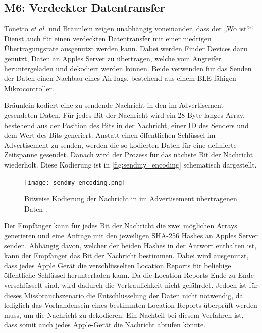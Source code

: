 \subsection{M6: Verdeckter Datentransfer}
\label{missbrauch:6}
Tonetto \textit{et al.} \cite{Tonetto_FindMy} und Bräunlein \cite{braeunlein_sendmy} zeigen unabhängig voneinander, dass der „Wo ist?“ Dienst auch für einen verdeckten Datentransfer mit einer niedrigen Übertragungsrate ausgenutzt werden kann.
Dabei werden Finder Devices dazu genutzt, Daten an Apples Server zu übertragen, welche vom Angreifer heruntergeladen und dekodiert werden können.
Beide verwenden für das Senden der Daten einen Nachbau eines AirTags, bestehend aus einem \ac{BLE}-fähigen Mikrocontroller.

Bräunlein \cite{braeunlein_sendmy} kodiert eine zu sendende Nachricht in den im Advertisement gesendeten Daten.
Für jedes Bit der Nachricht wird ein 28 Byte langes Array, bestehend aus der Position des Bits in der Nachricht, einer ID des Senders und dem Wert des Bits generiert.
Anstatt einen öffentlichen Schlüssel im Advertisement zu senden, werden die so kodierten Daten für eine definierte Zeitspanne gesendet.
Danach wird der Prozess für das nächste Bit der Nachricht wiederholt.
Diese Kodierung ist in \autoref{fig:sendmy_encoding} schematisch dargestellt.
\begin{figure}[ht]
  \centering
  \texttt{[image: sendmy\_encoding.png]}
  \caption{Bitweise Kodierung der Nachricht in im Advertisement übertragenen Daten \cite{braeunlein_sendmy}.}
  \label{fig:sendmy_encoding}
\end{figure}
Der Empfänger kann für jedes Bit der Nachricht die zwei möglichen Arrays generieren und eine Anfrage mit den jeweiligen \ac{SHA}-256 Hashes an Apples Server senden.
Abhängig davon, welcher der beiden Hashes in der Antwort enthalten ist, kann der Empfänger das Bit der Nachricht bestimmen.
Dabei wird ausgenutzt, dass jedes Apple Gerät die verschlüsselten Location Reports für beliebige öffentliche Schlüssel herunterladen kann.
Da die Location Reports Ende-zu-Ende verschlüsselt sind, wird dadurch die Vertraulichkeit nicht gefährdet.
Jedoch ist für dieses Missbrauchszenario die Entschlüsselung der Daten nicht notwendig, da lediglich das Vorhandensein eines bestimmten Location Reports überprüft werden muss, um die Nachricht zu dekodieren.
Ein Nachteil bei diesem Verfahren ist, dass somit auch jedes Apple-Gerät die Nachricht abrufen könnte.


